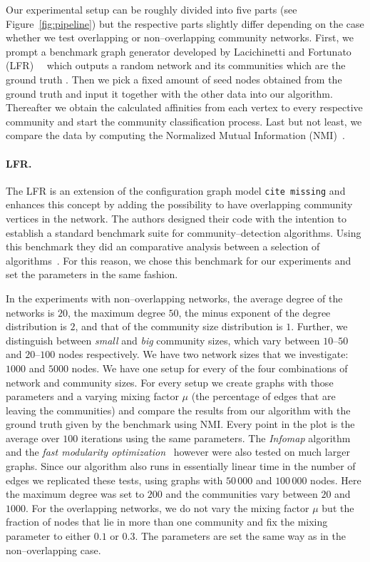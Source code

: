 Our experimental setup can be roughly divided into five parts (see Figure~\ref{fig:pipeline}) but the respective parts slightly differ depending on the case whether we test overlapping or non--overlapping community networks. First, we prompt a benchmark graph generator developed by Lacichinetti and Fortunato (LFR)~\cite{LFR08}~\cite{LFR09} which outputs a random network and its communities which are the ground truth . Then we pick a fixed amount of seed nodes obtained from the ground truth and input it together 
with the other data into our algorithm. Thereafter we obtain the calculated 
affinities from each vertex to every respective community and start the 
community classification process. Last but not least, we compare the data by 
computing the Normalized Mutual Information (NMI)~\cite{DDDA05}.


\paragraph{LFR.}
The LFR is an extension of the configuration graph model \texttt{cite missing} and enhances this concept by adding the possibility to have overlapping community vertices in the network. The authors designed their code with the intention to establish a standard benchmark suite for community--detection algorithms. Using this benchmark they did an comparative analysis between a selection of algorithms~\cite{LF09}. For this reason, we chose this benchmark for our experiments and set the parameters in the same fashion. 

In the experiments with non--overlapping networks, the average degree of the networks is $20$, the maximum degree $50$, the minus exponent of the degree distribution is $2$, and that of the community size distribution is $1$. Further, we distinguish between \textit{small} and \textit{big} community sizes, which vary between $10$--$50$ and $20$--$100$ nodes respectively. We have two network sizes that we investigate: $1000$ and $5000$ nodes. We have one setup for every of the four combinations of network and community sizes. For every setup we create graphs with those parameters and a varying mixing factor $\mu$ (the percentage of edges that are leaving the communities) and compare the results from our algorithm with the ground truth given by the benchmark using NMI. Every point in the plot is the average over $100$ iterations using the same parameters. The \textit{Infomap} algorithm~\cite{RB08} and the \textit{fast modularity optimization}~\cite{BGLL08} however were also tested on much larger graphs. Since our algorithm also runs in essentially linear time in the number of edges we replicated these tests, using graphs with $50\,000$ and $100\,000$ nodes. Here the maximum degree was set to $200$ and the communities vary between $20$ and $1000$. For the overlapping networks, we do not vary the mixing factor $\mu$ but the fraction of nodes that lie in more than one community and fix the mixing parameter to either $0.1$ or $0.3$. The parameters are set the same way as in the non--overlapping case.


